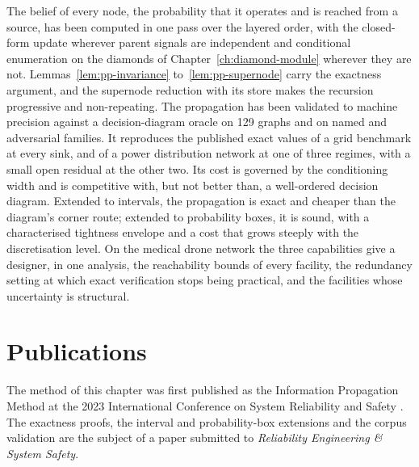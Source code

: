 \documentclass[12pt]{report}
\begin{document}
The belief of every node, the probability that it operates and is reached from a source,
has been computed in one pass over the layered order, with the closed-form update wherever
parent signals are independent and conditional enumeration on the diamonds of
Chapter~\ref{ch:diamond-module} wherever they are not.
Lemmas~\ref{lem:pp-invariance} to~\ref{lem:pp-supernode} carry the exactness argument, and
the supernode reduction with its store makes the recursion progressive and non-repeating.
The propagation has been validated to machine precision against a decision-diagram oracle on 129 graphs and on named and adversarial families. It reproduces the published exact values of a grid benchmark at every sink, and of a power distribution network at one of three regimes, with a small open residual at the other two. Its cost is governed by the
conditioning width and is competitive with, but not better than, a well-ordered decision
diagram. Extended to intervals, the propagation is exact and cheaper than the diagram's
corner route; extended to probability boxes, it is sound, with a characterised tightness
envelope and a cost that grows steeply with the discretisation level. On the medical drone
network the three capabilities give a designer, in one analysis, the reachability bounds of
every facility, the redundancy setting at which exact verification stops being practical,
and the facilities whose uncertainty is structural.

\section*{Publications}

The method of this chapter was first published as the Information Propagation Method at the
2023 International Conference on System Reliability and Safety
\cite{ohiani_information_2023}. The exactness proofs, the interval and probability-box
extensions and the corpus validation are the subject of a paper submitted to
\textit{Reliability Engineering \& System Safety}.

\ifdefined\maindoc
\else
\printbibliography
\end{document}
